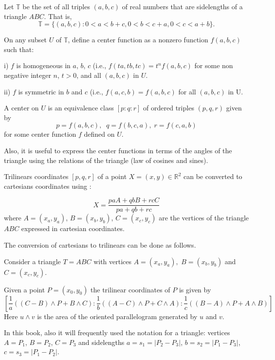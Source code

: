 Let $\mathbb{T}$ be the set of all triples $(a, b, c)$ of real numbers that are sidelengths of a triangle $ABC$. That is,
\[
\mathbb{T} = \{ (a, b, c): 0 <a< b + c, 0 <b < c +a, 0 < c < a+ b\}.\]

On any subset $U$ of $\mathbb{T}$, define a center  function as a nonzero function $f(a, b, c)$ such that:

\noindent i) $f$ is homogeneous in $a$, $b$, $c$ (i.e., $f(ta, tb, tc) = t^n f(a, b, c)$   for some non negative integer
$n$,  $t > 0$, and all $(a, b, c) $ in $U$.

\noindent ii) $f$ is  symmetric in $b$ and $c$ (i.e., $f(a, c, b)= f(a, b, c)$
for all $(a, b, c)$ in U. 


A center on $U$ is an equivalence class $[p:q:r]$ of ordered triples
$(p,q,r) $ given by
 \[p= f( a, b, c),\;\; q= f( b, c, a),\; r = f( c, a, b)\]
for some center function $f$ defined on $U$. 

\begin{remark}
 Also, it is useful to express the center functions in terms of the angles of the triangle using the relations of the triangle (law of cosines and sines).
\end{remark}
 
Trilinears coordinates $[p,q,r]$  of a point $X=(x,y) \in \mathbb{R}^2$ can be  converted to cartesians coordinates using \cite{mw}:

\begin{equation}
\label{eqn:trilin-cartesian}
X=\frac{pa A + q b B + rc C}{pa+qb+rc}
\end{equation}
where $A=(x_a,y_a)$, $B=(x_b,y_b)$, $C=(x_c,y_c)$ are the vertices of the triangle $ABC$ expressed in cartesian coordinates.

The conversion of cartesians  to trilinears can be done as follows.

Consider a triangle $T=ABC$ with vertices $A=(x_a,y_a),$ $B=(x_b,y_b)$ and $C=(x_c,y_c)$.

Given a point $P=(x_0,y_0)$ the trilinear coordinates of $P$
is given by
{\small 
\[ \left[ \frac{1}{a}( (C-B)\wedge P+B\wedge C): \frac{1}{b}( (A-C)\wedge P+C\wedge A): \frac{1}{c}( (B-A)\wedge P+A\wedge B)\right] \]}
Here $u\wedge v$ is the area of the oriented parallelogram generated by $u$ and $v$.

\begin{remark}
In this book, also it will  frequently used the notation for a triangle: vertices $A=P_1$, $B=P_2$, $C=P_3$ and sidelengths $a=s_1=|P_2-P_3|$, $b=s_2=|P_1-P_3|$,
$c=s_3=|P_1-P_2|$.
\end{remark}

